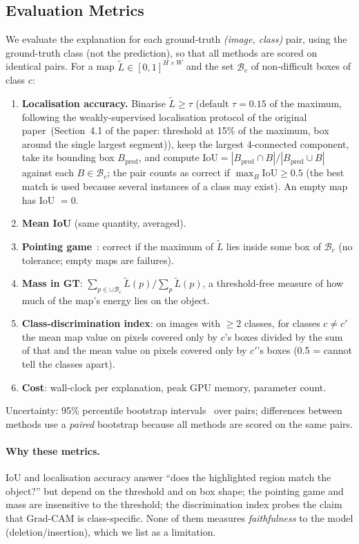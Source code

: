 \documentclass[11pt,a4paper]{article}
\newcommand{\GC}{Grad-CAM}
\begin{document}
\subsection{Evaluation Metrics}\label{sec:metrics}
We evaluate the explanation for each ground-truth \emph{(image, class)} pair, using the ground-truth class (not the prediction), so that all methods are scored on identical pairs. For a map $\tilde L\in[0,1]^{H\times W}$ and the set $\mathcal{B}_c$ of non-difficult boxes of class $c$:
\begin{enumerate}
\item \textbf{Localisation accuracy.} Binarise $\tilde L\ge\tau$ (default $\tau=0.15$ of the maximum, following the weakly-supervised localisation protocol of the original paper~(Section~4.1 of the paper: threshold at 15\% of the maximum, box around the single largest segment)), keep the largest 4-connected component, take its bounding box $B_{\text{pred}}$, and compute
$\mathrm{IoU}=|B_{\text{pred}}\cap B|/|B_{\text{pred}}\cup B|$ against each $B\in\mathcal{B}_c$; the pair counts as correct if $\max_B\mathrm{IoU}\ge0.5$ (the best match is used because several instances of a class may exist). An empty map has IoU $=0$.
\item \textbf{Mean IoU} (same quantity, averaged).
\item \textbf{Pointing game}~\citep{zhang2018}: correct if the maximum of $\tilde L$ lies inside some box of $\mathcal{B}_c$ (no tolerance; empty maps are failures).
\item \textbf{Mass in GT}: $\sum_{p\in\cup\mathcal{B}_c}\tilde L(p)\big/\sum_p\tilde L(p)$, a threshold-free measure of how much of the map's energy lies on the object.
\item \textbf{Class-discrimination index}: on images with $\ge2$ classes, for classes $c\neq c'$ the mean map value on pixels covered only by $c$'s boxes divided by the sum of that and the mean value on pixels covered only by $c'$'s boxes (0.5 = cannot tell the classes apart).
\item \textbf{Cost}: wall-clock per explanation, peak GPU memory, parameter count.
\end{enumerate}
Uncertainty: 95\% percentile bootstrap intervals~\citep{efron1979} over pairs; differences between methods use a \emph{paired} bootstrap because all methods are scored on the same pairs.
\paragraph{Why these metrics.} IoU and localisation accuracy answer ``does the highlighted region match the object?'' but depend on the threshold and on box shape; the pointing game and mass are insensitive to the threshold; the discrimination index probes the claim that \GC{} is class-specific. None of them measures \emph{faithfulness} to the model (deletion/insertion), which we list as a limitation.
\end{document}
